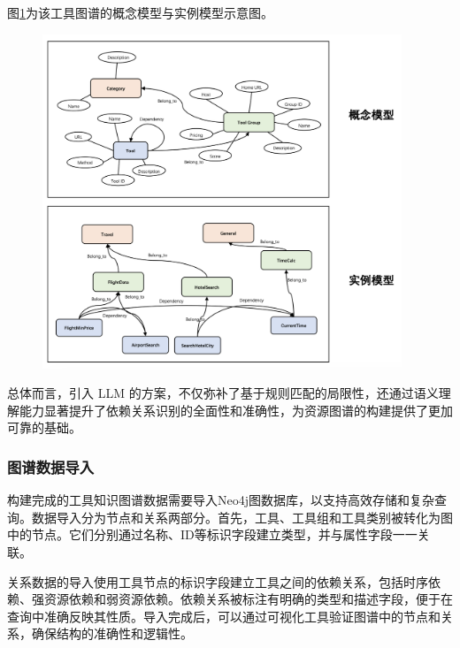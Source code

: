 图\ref{fig:ch3-knowledge-graph-model}为该工具图谱的概念模型与实例模型示意图。

\begin{figure}[H]
    \vspace{1em}
    \centering
    \setlength{\abovecaptionskip}{10pt} %
    \includegraphics[height=10cm]{../assets/概念模型和实例模型.png}
    \label{fig:ch3-knowledge-graph-model}
\end{figure}

总体而言，引入 LLM 的方案，不仅弥补了基于规则匹配的局限性，还通过语义理解能力显著提升了依赖关系识别的全面性和准确性，为资源图谱的构建提供了更加可靠的基础。

\subsubsection{图谱数据导入}

构建完成的工具知识图谱数据需要导入Neo4j图数据库，以支持高效存储和复杂查询。数据导入分为节点和关系两部分。首先，工具、工具组和工具类别被转化为图中的节点。它们分别通过名称、ID等标识字段建立类型，并与属性字段一一关联。

关系数据的导入使用工具节点的标识字段建立工具之间的依赖关系，包括时序依赖、强资源依赖和弱资源依赖。依赖关系被标注有明确的类型和描述字段，便于在查询中准确反映其性质。导入完成后，可以通过可视化工具验证图谱中的节点和关系，确保结构的准确性和逻辑性。

